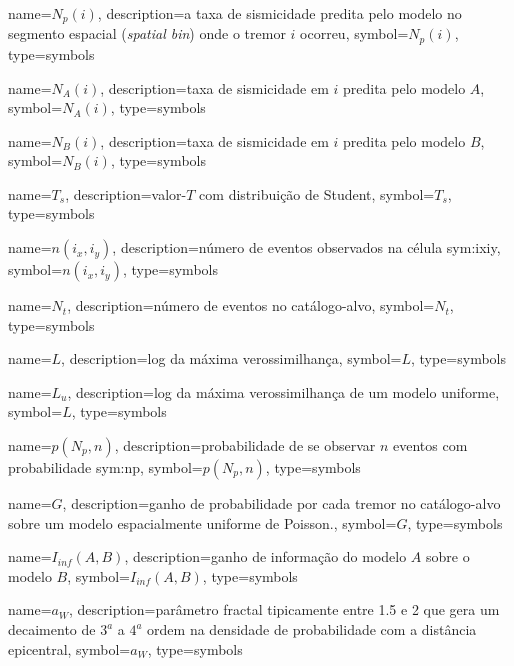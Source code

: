 {
	name={\ensuremath{N_p(i)}},
	description={a taxa de sismicidade predita pelo modelo no segmento espacial (\emph{spatial bin}) onde o tremor $i$
	ocorreu}, symbol={\ensuremath{N_p(i)}},
	type=symbols
}


{
	name={\ensuremath{N_A(i)}},
	description={taxa de sismicidade em $i$ predita pelo modelo $A$}, 
	symbol={\ensuremath{N_A(i)}},
	type=symbols
}


{
	name={\ensuremath{N_B(i)}},
	description={taxa de sismicidade em $i$ predita pelo modelo $B$},
	symbol={\ensuremath{N_B(i)}},
	type=symbols
}


{
	name={\ensuremath{T_s}},
	description={valor-$T$ com distribuição de Student},
	symbol={\ensuremath{T_s}},
	type=symbols
}

{
	name={\ensuremath{n\left(i_x, i_y\right)}},
	description={número de eventos observados na célula \gls{sym:ixiy}},
	symbol={\ensuremath{n\left(i_x, i_y\right)}},
	type=symbols
}


{
	name={\ensuremath{N_t}},
	description={número de eventos no catálogo-alvo},
	symbol={\ensuremath{N_t}},
	type=symbols
}



{
	name={\ensuremath{L}},
	description={log da máxima verossimilhança},
	symbol={\ensuremath{L}},
	type=symbols
}


{
	name={\ensuremath{L_u}},
	description={log da máxima verossimilhança de um modelo uniforme},
	symbol={\ensuremath{L}},
	type=symbols
}


{
	name={\ensuremath{p(N_p, n)}},
	description={probabilidade de se observar $n$ eventos com probabilidade \gls{sym:np}},
	symbol={\ensuremath{p(N_p, n)}},
	type=symbols
}


{
	name={\ensuremath{G}},
	description={ganho de probabilidade por cada tremor no catálogo-alvo
				 sobre um modelo espacialmente uniforme de Poisson.}, 
	symbol={\ensuremath{G}}, 
	type=symbols
}


{
	name={\ensuremath{ I_{inf}(A,B)}},
	description={ganho de informação do modelo $A$ sobre o modelo $B$}, 
	symbol={\ensuremath{I_{inf}(A,B)}}, 
	type=symbols
}


{
	name={\ensuremath{a_W}},
	description={parâmetro fractal tipicamente entre 1.5 e 2 
				 que gera um decaimento de $3^{a}$ a $4^{a}$ ordem 
				 na densidade de probabilidade com a distância epicentral}, 
	symbol={\ensuremath{a_W}}, 
	type=symbols
}



